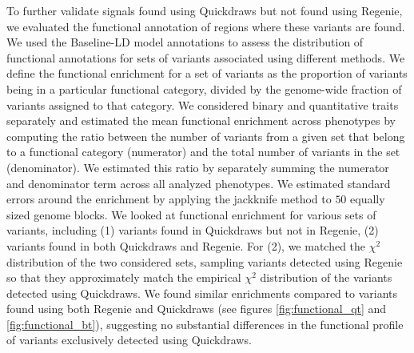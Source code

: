 %
To further validate signals found using Quickdraws but not found using Regenie, we evaluated the functional annotation of regions where these variants are found.
%
We used the Baseline-LD model annotations \cite{finucane2015partitioning,gazal2017linkage} to assess the distribution of functional annotations for sets of variants associated using different methods.
%
We define the functional enrichment for a set of variants as the proportion of variants being in a particular functional category, divided by the genome-wide fraction of variants assigned to that category.
%
We considered binary and quantitative traits separately and estimated the mean functional enrichment across phenotypes by computing the ratio between the number of variants from a given set that belong to a functional category (numerator) and the total number of variants in the set (denominator).
%
We estimated this ratio by separately summing the numerator and denominator term across all analyzed phenotypes.
%
We estimated standard errors around the enrichment by applying the jackknife method to $50$ equally sized genome blocks.
%
We looked at functional enrichment for various sets of variants, including (1) variants found in Quickdraws but not in Regenie, (2) variants found in both Quickdraws and Regenie.
%
For (2), we matched the $\chi^2$ distribution of the two considered sets, sampling variants detected using Regenie so that they approximately match the empirical $\chi^2$ distribution of the variants detected using Quickdraws.
%
We found similar enrichments compared to variants found using both Regenie and Quickdraws (see figures \ref{fig:functional_qt} and \ref{fig:functional_bt}), suggesting no substantial differences in the functional profile of variants exclusively detected using Quickdraws.
%

